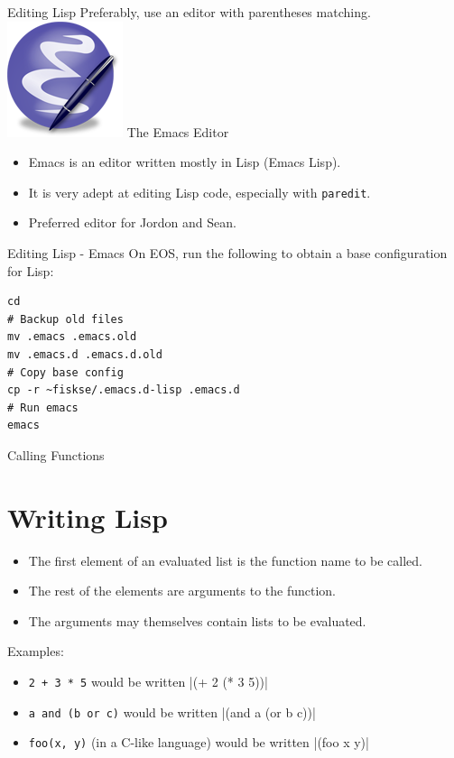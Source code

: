 \documentclass{beamer}
\begin{document}

\begin{frame}{Editing Lisp}
  Preferably, use an editor with parentheses matching.
  \includegraphics[height=\textheight/4]{images/emacs}
  The Emacs Editor
  \begin{itemize}
    \item Emacs is an editor written mostly in Lisp (Emacs Lisp).
    \item It is very adept at editing Lisp code, especially with \texttt{paredit}.
    \item Preferred editor for Jordon and Sean.
    \end{itemize}
  \end{frame}

\begin{frame}[fragile]{Editing Lisp - Emacs}
On EOS, run the following to obtain a base configuration for Lisp:
\begin{verbatim}
cd
# Backup old files
mv .emacs .emacs.old
mv .emacs.d .emacs.d.old
# Copy base config
cp -r ~fiskse/.emacs.d-lisp .emacs.d
# Run emacs
emacs
\end{verbatim}
\end{frame}

\begin{frame}{Calling Functions}
\section{Writing Lisp}
\begin{itemize}
\item The first element of an evaluated list is the function name to be called.
\item The rest of the elements are arguments to the function.
\item The arguments may themselves contain lists to be evaluated.
\end{itemize}
Examples:
\begin{itemize}
\item \texttt{2 + 3 * 5} would be written \cl|(+ 2 (* 3 5))|
\item \texttt{a and (b or c)} would be written \cl|(and a (or b c))|
\item \texttt{foo(x, y)} (in a C-like language) would be written \cl|(foo x y)|
\end{itemize}
\end{frame}
\end{document}

